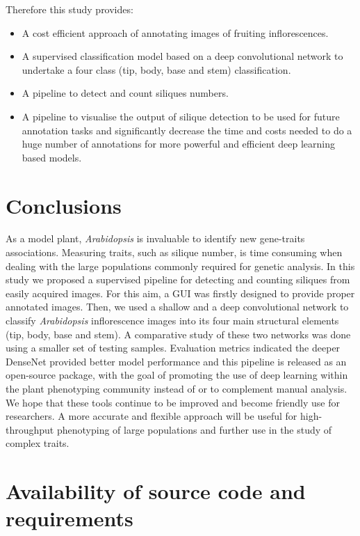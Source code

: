 \documentclass[a4paper,num-refs]{oup-contemporary}
\begin{document}
Therefore this study provides: 
\begin{itemize}
    \item A cost efficient approach of annotating  images of fruiting inflorescences.
    \item A supervised classification model based on a deep convolutional network to undertake a four class (tip, body, base and stem) classification.
    \item A pipeline to detect and count siliques numbers. 
    \item A pipeline to visualise the output of silique detection to be used for future annotation tasks and significantly decrease the time and costs needed to do a huge number of annotations for more powerful and efficient deep learning based models.
\end{itemize}   

\section{Conclusions}
As a model plant, \textit{Arabidopsis} is invaluable to identify new gene-traits associations. Measuring  traits, such as silique number, is time consuming  when dealing with the large populations  commonly required for genetic analysis. In this study we proposed a supervised pipeline for detecting and counting siliques from easily acquired images. For this aim, a GUI was firstly designed to provide proper annotated images. 
Then, we used a shallow and a deep convolutional network to classify \textit{Arabidopsis} inflorescence images into its four main structural elements (tip, body, base and stem). A comparative study of these two networks was done using a smaller set of testing samples. Evaluation metrics indicated the deeper DenseNet provided better model performance and this pipeline is released as an open-source package, with the goal of promoting the use of deep learning within the plant phenotyping community instead of or to complement manual analysis. We hope that these tools continue to be improved and become friendly use for researchers. A more accurate and flexible approach will be useful for high-throughput phenotyping of large populations and further use in the study of complex traits. 

\section{Availability of source code and requirements} 
\end{document}

